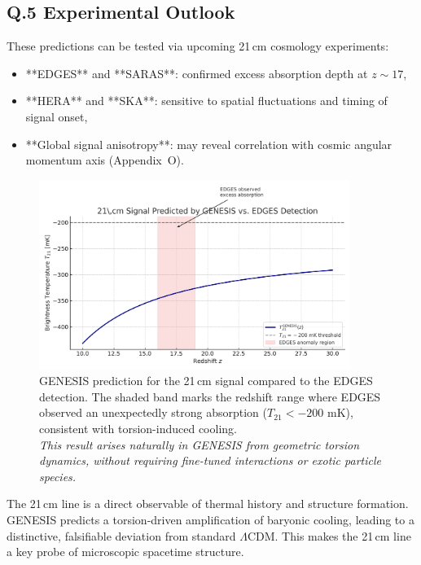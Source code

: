 \documentclass{article}
\begin{document}
\subsection*{Q.5 Experimental Outlook}
These predictions can be tested via upcoming 21\,cm cosmology experiments:
\begin{itemize}
  \item **EDGES** and **SARAS**: confirmed excess absorption depth at \(z \sim 17\),
  \item **HERA** and **SKA**: sensitive to spatial fluctuations and timing of signal onset,
  \item **Global signal anisotropy**: may reveal correlation with cosmic angular momentum axis (Appendix~O).
\end{itemize}

\begin{figure}[h!]
\centering
\includegraphics[width=0.9\textwidth]{T21_GENESIS_with_EDGES.png}
\caption{
GENESIS prediction for the 21\,cm signal compared to the EDGES detection.
The shaded band marks the redshift range where EDGES observed an unexpectedly strong absorption ($T_{21} < -200$ mK), consistent with torsion-induced cooling.\\
\textit{This result arises naturally in GENESIS from geometric torsion dynamics, without requiring fine-tuned interactions or exotic particle species.}
}
\label{fig:T21_EDGES}
\end{figure}



\begin{tcolorbox}[colback=gray!5, colframe=black!30, title=Why this matters]
The 21\,cm line is a direct observable of thermal history and structure formation. GENESIS predicts a torsion-driven amplification of baryonic cooling, leading to a distinctive, falsifiable deviation from standard $\Lambda$CDM. This makes the 21\,cm line a key probe of microscopic spacetime structure.
\end{tcolorbox}
\end{document}
